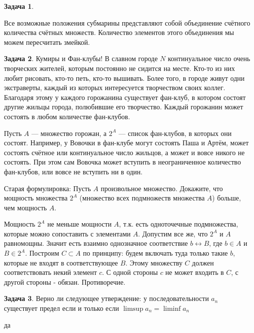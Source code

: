\documentclass[pdftex, 12pt, a4paper]{article}
\theoremstyle{definition} %
\newtheorem{problem}{Задача}
\numberwithin{problem}{section}
\numberwithin{blits}{section}
\begin{document}
\begin{problem}
\begin{sol}
Все возможные положения субмарины представляют собой объединение счётного количества счётных множеств. Количество элементов этого объединения мы можем пересчитать змейкой.
\end{sol}
\end{problem}


\begin{problem}\label{upr2} Кумиры и Фан-клубы!
В славном городе $N$ континуальное число очень творческих жителей, которым постоянно не сидится на месте. Кто-то из них любит рисовать, кто-то петь, кто-то вышивать. Более того, в городе живут одни экстраверты, каждый из которых интересуется творчеством своих коллег. Благодаря этому у каждого горожанина существует фан-клуб, в котором состоят другие жильцы города, полюбившие его творчество. Каждый горожанин может состоять в любом количестве фан-клубов.

Пусть $A$ --- множество горожан, а $2^A$ ---  список фан-клубов, в которых они состоят. Например, у Вовочки в фан-клубе могут состоять Паша и Артём, может состоять счётное или континуальное число жильцов, а может и вовсе никого не состоять. При этом сам Вовочка может вступить в неограниченное количество фан-клубов, или вовсе не вступить ни в один.

Старая формулировка:
Пусть $A$ произвольное множество. Докажите, что мощность множества $2^{A}$ (множество всех подмножеств множества $A$) больше, чем мощность $A$.
\begin{sol}
Мощность $2^{A}$ не меньше мощности $A$, т.к. есть одноточечные подмножества, которые можно сопоставить с элементами $A$. Допустим все же, что $2^{A}$ и $A$ равномощны. Значит есть взаимно однозначное соответствие $b\longleftrightarrow B$, где $b\in A$ и $B\in 2^{A}$. Построим $C\subset A$ по принципу: будем включать туда только такие $b$, которые не входят в соответствующее $B$. Этому множеству $C$ должен соответствовать некий элемент $c$. С одной стороны $c$ не может входить в $C$, с другой стороны - обязан. Противоречие.
\end{sol}
\end{problem}


\begin{problem}

Верно ли следующее утверждение: у последовательности $a_{n}$ существует предел если и только если $\limsup a_{n}=\liminf a_{n}$
\begin{sol}
да
\end{sol}
\end{problem}
\end{document}
